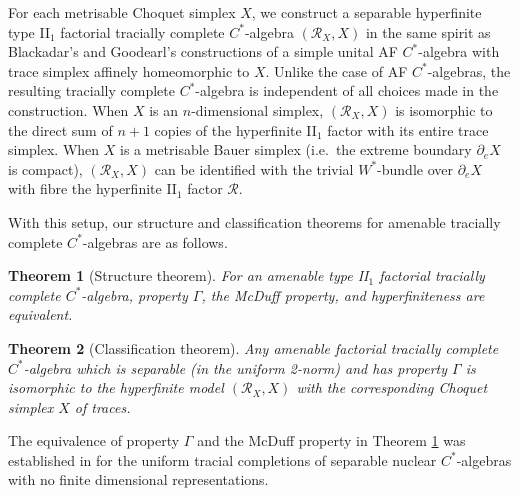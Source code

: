 \documentclass[a4paper,11pt]{amsart}
\newtheorem{theorem}{Theorem}
\theoremstyle{definition}
\numberwithin{equation}{section}
\numberwithin{theorem}{section}
\begin{document}
\begin{description}[leftmargin=\parindent, labelindent = 0cm]
\item[Concrete models] For each metrisable Choquet simplex $X$, we construct a separable hyperfinite type II$_1$ factorial tracially complete $C^*$-algebra $(\mathcal R_X,X)$ in the same spirit as Blackadar's and Goodearl's constructions of a simple unital AF $C^*$-algebra with trace simplex affinely homeomorphic to $X$.  Unlike the case of AF $C^*$-algebras, the resulting tracially complete $C^*$-algebra is independent of all choices made in the construction. When $X$ is an $n$-dimensional simplex, $(\mathcal R_X,X)$ is isomorphic to the direct sum of $n+1$ copies of the hyperfinite II$_1$ factor with its entire trace simplex.  When $X$ is a
metrisable Bauer simplex (i.e.\ the extreme boundary $\partial_e X$ is compact), $(\mathcal R_X, X)$ can be identified with the trivial $W^*$-bundle over $\partial_e X$ with fibre the hyperfinite II$_1$ factor $\mathcal R$.  

\end{description}
With this setup, our structure and classification theorems for amenable tracially complete $C^*$-algebras are as follows.


\begin{theorem}[Structure theorem]\label{InformalStructureThm}
For an amenable type {\rm II}$_1$ factorial tracially complete $C^*$-algebra, property $\Gamma$, the McDuff property, and hyperfiniteness are equivalent.
\end{theorem}
\begin{theorem}[Classification theorem]\label{InformalClassification}
Any amenable factorial tracially complete $C^*$-algebra which is separable (in the uniform 2-norm) and has property $\Gamma$ is isomorphic to the hyperfinite model $(\mathcal R_X,X)$ with the corresponding Choquet simplex $X$ of traces.
\end{theorem}

The equivalence of property $\Gamma$ and the McDuff property in Theorem \ref{InformalStructureThm} was established in \cite{CETW} for the uniform tracial completions of separable nuclear $C^*$-algebras with no finite dimensional representations.  
\end{document}
